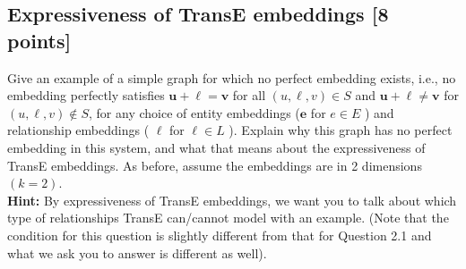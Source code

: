 \documentclass{article}
\numberwithin{figure}{section}
\begin{document}
\subsection{Expressiveness of TransE embeddings [8 points]}
Give an example of a simple graph for which no perfect embedding exists, i.e., no embedding perfectly satisfies $\mathbf{u}+\boldsymbol{\ell}=\mathbf{v}$ for all $(u, \ell, v) \in S$ and $\mathbf{u}+\boldsymbol{\ell} \neq \mathbf{v}$ for $(u, \ell, v) \notin S$, for any choice of entity embeddings ($\mathbf{e}$ for $e \in E$ ) and relationship embeddings ( $\boldsymbol{\ell}$ for $\ell \in L$ ). Explain why this graph has no perfect embedding in this system, and what that means about the expressiveness of TransE embeddings. As before, assume the embeddings are in 2 dimensions $(k=2)$.\\
\textbf{Hint: }By expressiveness of TransE embeddings, we want you to talk about which type of relationships TransE can/cannot model with an example. (Note that the condition for this question is slightly different from that for Question 2.1 and what we ask you to answer is different as well).
\end{document}
